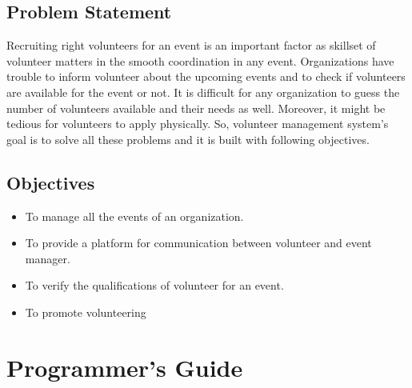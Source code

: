 \documentclass[12pt]{article}
\begin{document}
\subsection{Problem Statement}
Recruiting right volunteers for an event is an important factor as skillset of volunteer matters in the smooth coordination in any event. Organizations have trouble to inform volunteer about the upcoming events and to check if volunteers are available for the event or not. It is difficult for any organization to guess the number of volunteers available and their needs as well. Moreover, it might be tedious for volunteers to apply physically. So, volunteer management system's goal is to solve all these problems and it is built with following objectives.

\subsection{Objectives}
\begin{itemize}
	\item To manage all the events of an organization.
	\item To provide a platform for communication between volunteer and event manager.
	\item To verify the qualifications of volunteer for an event.
	\item To promote volunteering
\end{itemize}

\clearpage
\clearpage

\section{Programmer's Guide}
\end{document}
